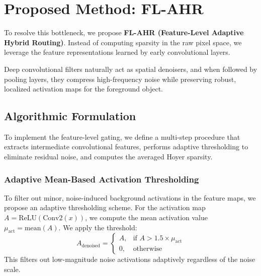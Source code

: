 \documentclass{article}
\theoremstyle{plain}
\theoremstyle{definition}
\theoremstyle{remark}
\begin{document}
\section{Proposed Method: FL-AHR}
\label{submission-method}

To resolve this bottleneck, we propose \textbf{FL-AHR (Feature-Level Adaptive Hybrid Routing)}. Instead of computing sparsity in the raw pixel space, we leverage the feature representations learned by early convolutional layers. 

Deep convolutional filters naturally act as spatial denoisers, and when followed by pooling layers, they compress high-frequency noise while preserving robust, localized activation maps for the foreground object.

\subsection{Algorithmic Formulation}
To implement the feature-level gating, we define a multi-step procedure that extracts intermediate convolutional features, performs adaptive thresholding to eliminate residual noise, and computes the averaged Hoyer sparsity.

\subsubsection{Adaptive Mean-Based Activation Thresholding}
To filter out minor, noise-induced background activations in the feature maps, we propose an adaptive thresholding scheme. For the activation map $A = \text{ReLU}(\text{Conv2}(x))$, we compute the mean activation value $\mu_{\text{act}} = \text{mean}(A)$. We apply the threshold:
\begin{equation}
  A_{\text{denoised}} = \begin{cases} A, & \text{if } A > 1.5 \times \mu_{\text{act}} \\ 0, & \text{otherwise} \end{cases}
\end{equation}
This filters out low-magnitude noise activations adaptively regardless of the noise scale.
\end{document}
